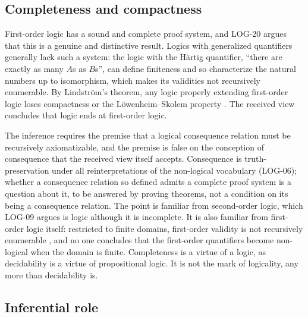 \documentclass{situationist-preprint}
\begin{document}
\subsection{Completeness and compactness}

First-order logic has a sound and complete proof system, and LOG-20 argues that this is a genuine and distinctive result. Logics with generalized quantifiers generally lack such a system: the logic with the Härtig quantifier, \enquote{there are exactly as many $A$s as $B$s}, can define finiteness and so characterize the natural numbers up to isomorphism, which makes its validities not recursively enumerable. By Lindstr\"om's theorem, any logic properly extending first-order logic loses compactness or the L\"owenheim--Skolem property \citep{Lindstrom1969}. The received view concludes that logic ends at first-order logic.

The inference requires the premise that a logical consequence relation must be recursively axiomatizable, and the premise is false on the conception of consequence that the received view itself accepts. Consequence is truth-preservation under all reinterpretations of the non-logical vocabulary (LOG-06); whether a consequence relation so defined admits a complete proof system is a question about it, to be answered by proving theorems, not a condition on its being a consequence relation. The point is familiar from second-order logic, which LOG-09 argues is logic although it is incomplete. It is also familiar from first-order logic itself: restricted to finite domains, first-order validity is not recursively enumerable \citep{Trakhtenbrot1950}, and no one concludes that the first-order quantifiers become non-logical when the domain is finite. Completeness is a virtue of a logic, as decidability is a virtue of propositional logic. It is not the mark of logicality, any more than decidability is.

\subsection{Inferential role}
\end{document}
